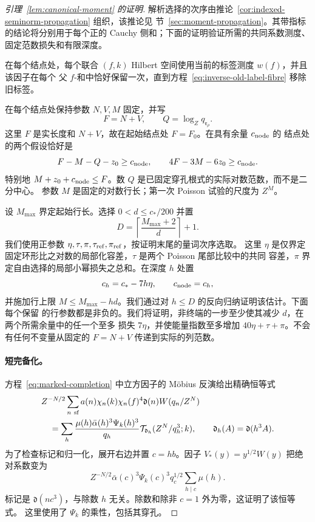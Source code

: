 \begin{proof}[引理~\ref{lem:canonical-moment} 的证明]
解析选择的次序由推论~\ref{cor:indexed-seminorm-propagation} 组织，该推论见
节~\ref{sec:moment-propagation}。其带指标的结论将分别用于每个正的 Cauchy
侧和；下面的证明验证所需的共同系数测度、固定范数损失和有限深度。

在每个结点处，每个联合 \((f,k)\) Hilbert 空间使用当前的标签测度 \(w(f)\)，并且该因子在每个
父 \(f\)-和中恰好保留一次，直到方程~\eqref{eq:inverse-old-label-fibre} 移除旧标签。

在每个结点处保持参数 \(N,V,M\) 固定，并写
\[
 F=N+V,\qquad Q=\log_Zq_{\mathfrak r_\rho}.
\]
这里 \(F\) 是实长度和 \(N+V\)，故在起始结点处 \(F=F_0\)。在具有余量 \(c_{\rm node}\) 的
结点处的两个假设恰好是
\begin{equation}\label{eq:inverse-fixed-invariant}
 F-M-Q-z_0\ge c_{\rm node},\qquad
 4F-3M-6z_0\ge c_{\rm node}.
\end{equation}
特别地 \(M+z_0+c_{\rm node}\le F\)。数 \(Q\) 是已固定穿孔根式的实际对数范数，而不是二分中心。
参数 \(M\) 是固定的对数行长；第一次 Poisson 试验的尺度为 \(Z^M\)。

设 \(M_{\max}\) 界定起始行长。选择 \(0<d\le c_*/200\) 并置
\[
 D=\left\lceil\frac{M_{\max}+2}{d}\right\rceil+1.
\]
我们使用正参数 \(\eta,\tau,\pi,\tau_{\rm ref},\pi_{\rm ref}\)，按证明末尾的量词次序选取。
这里 \(\eta\) 是仅界定固定环形比之对数的局部化容差，\(\tau\) 是两个 Poisson 尾部比较中的共同
容差，\(\pi\) 界定自由选择的局部小幂损失之总和。在深度 \(h\) 处置
\[
 c_h=c_*-7h\eta,\qquad c_{\rm node}=c_h,
\]
并施加行上限 \(M\le M_{\max}-hd\)。我们通过对 \(h\le D\) 的反向归纳证明该估计。下面每个保留
的行参数都是非负的。我们将证明，非终端的一步至少使其减少 \(d\)，在两个所需余量中的任一个至多
损失 \(7\eta\)，并使能量指数至多增加 \(40\eta+\tau+\pi\)。不会有任何不变量从固定的 \(F=N+V\)
传递到实际的列范数。

\paragraph{短完备化。}
方程~\eqref{eq:marked-completion} 中立方因子的 M\"obius 反演给出精确恒等式
\begin{equation}\label{eq:marked-completion-inversion}
 \begin{split}
 &Z^{-N/2}\sum_{n\ {\rm sf}}a(n)\chi_n(k)\chi_n(f)^4
       \mathfrak d(n)W(q_n/Z^N)\\
 &\quad=
 \sum_h\frac{\mu(h)\bar\alpha(h)^3\Psi_k(h)^3}{q_h}
       \mathcal T_{\mathfrak d_h}(Z^N/q_h^3;k),
 \qquad \mathfrak d_h(A)=\mathfrak d(h^3A).
 \end{split}
\end{equation}
为了检查标记和归一化，展开右边并置 \(c=hb\)。因子 \(V_*(y)=y^{1/2}W(y)\) 把绝对系数变为
\[
 Z^{-N/2}\bar\alpha(c)^3\Psi_k(c)^3q_c^{1/2}
       \sum_{h\mid c}\mu(h).
\]
标记是 \(\mathfrak d(nc^3)\)，与除数 \(h\) 无关。除数和除非 \(c=1\) 外为零，这证明了该恒等式。
这里使用了 \(\Psi_k\) 的乘性，包括其穿孔。


\end{proof}
